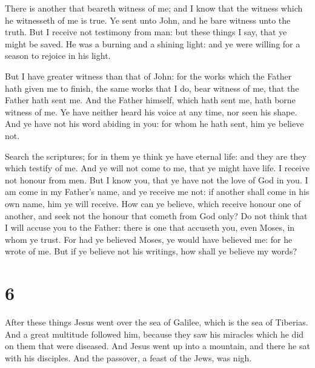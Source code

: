  There is another that beareth witness of me; and I know
that the witness which he witnesseth of me is true.  Ye
sent unto John, and he bare witness unto the truth.  But
I receive not testimony from man: but these things I say, that ye might
be saved.  He was a burning and a shining light: and ye
were willing for a season to rejoice in his light.

 But I have greater witness than that of John: for the
works which the Father hath given me to finish, the same works that I
do, bear witness of me, that the Father hath sent me. 
And the Father himself, which hath sent me, hath borne witness of me. Ye
have neither heard his voice at any time, nor seen his shape.
 And ye have not his word abiding in you: for whom he
hath sent, him ye believe not.

 Search the scriptures; for in them ye think ye have
eternal life: and they are they which testify of me.  And
ye will not come to me, that ye might have life.  I
receive not honour from men.  But I know you, that ye
have not the love of God in you.  I am come in my
Father's name, and ye receive me not: if another shall come in his own
name, him ye will receive.  How can ye believe, which
receive honour one of another, and seek not the honour that cometh from
God only?  Do not think that I will accuse you to the
Father: there is one that accuseth you, even Moses, in whom ye trust.
 For had ye believed Moses, ye would have believed me:
for he wrote of me.  But if ye believe not his writings,
how shall ye believe my words?

\hypertarget{section-5}{%
\section{6}\label{section-5}}

 After these things Jesus went over the sea of Galilee,
which is the sea of Tiberias.  And a great multitude
followed him, because they saw his miracles which he did on them that
were diseased.  And Jesus went up into a mountain, and
there he sat with his disciples.  And the passover, a
feast of the Jews, was nigh.

